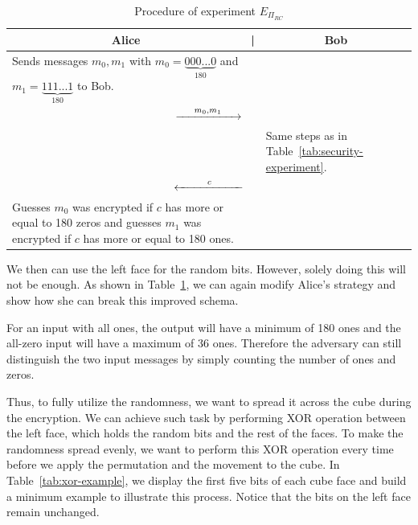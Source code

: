 \begin{table}[ht]
    \centering
    \begin{tabular}{|p{6.5cm}p{0.5cm}p{6.5cm}|}
        \hline \multicolumn{1}{|c}{Alice} & \multicolumn{1}{c}{|} & \multicolumn{1}{c|}{Bob} \\ \hline
        \hline Sends messages $m_0, m_1$ with $m_0 = \underbrace{000...0}_{180}$ and $m_1 = \underbrace{111...1}_{180}$ to Bob. & & \\
        \multicolumn{3}{|c|}{$\xrightarrow{\hspace{0.5cm} m_0, m_1 \hspace{0.5cm}}$} \\
        & & Same steps as in Table~\ref{tab:security-experiment}. \\
        \multicolumn{3}{|c|}{$\xleftarrow{\hspace{0.9cm} c \hspace{0.9cm}}$} \\
        Guesses $m_0$ was encrypted if $c$ has more or equal to 180 zeros and guesses $m_1$ was encrypted if $c$ has more or equal to 180 ones. & & \\
        \hline
    \end{tabular}
    \caption{Procedure of experiment $E_{\Pi_{RC}}$}
    \label{tab:improved-cube-security-experiment}
\end{table}
We then can use the left face for the random bits. However, solely doing this will not be enough. As shown in Table~\ref{tab:improved-cube-security-experiment}, we can again modify Alice's strategy and show how she can break this improved schema. 
\par For an input with all ones, the output will have a minimum of 180 ones and the all-zero input will have a maximum of 36 ones. Therefore the adversary can still distinguish the two input messages by simply counting the number of ones and zeros.
\par Thus, to fully utilize the randomness, we want to spread it across the cube during the encryption. We can achieve such task by performing XOR operation between the left face, which holds the random bits and the rest of the faces. To make the randomness spread evenly, we want to perform this XOR operation every time before we apply the permutation and the movement to the cube. In Table~\ref{tab:xor-example}, we display the first five bits of each cube face and build a minimum example to illustrate this process. Notice that the bits on the left face remain unchanged.
